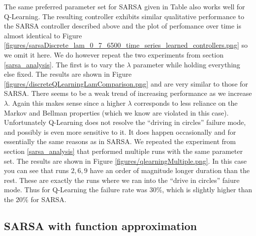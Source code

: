 \documentclass{article}
\begin{document}
The same preferred parameter set for SARSA given in Table  also works well for Q-Learning. The resulting controller exhibits similar qualitative performance to the SARSA controller described above and the plot of perfomance over time is almost identical to Figure \ref{figures/sarsaDiscrete_lam_0_7_6500_time_series_learned_controllers.png} so we omit it here. We do however repeat the two experiments from section \ref{sarsa_analysis}. The first is to vary the $\lambda$ parameter while holding everything else fixed. The results are shown in Figure \ref{figures/discreteQLearningLamComparison.png} and are very similar to those for SARSA. There seems to be a weak trend of increasing performance as we increase $\lambda$. Again this makes sense since a higher $\lambda$ corresponds to less reliance on the Markov and Bellman properties (which we know are violated in this case). Unfortunately Q-Learning does not resolve the ``driving in circles'' failure mode, and possibly is even more sensitive to it. It does happen occasionally and for essentially the same reasons as in SARSA. We repeated the experiment from section \ref{sarsa_analysis} that performed multiple runs with the same parameter set. The results are shown in Figure \ref{figures/qlearningMultiple.png}. In this case you can see that runs $2,6,9$ have an order of magnitude longer duration than the rest. These are exactly the runs where we ran into the ``drive in circles'' faiure mode. Thus for Q-Learning the failure rate was $30\%$, which is slightly higher than the $20\%$ for SARSA.




\subsection{SARSA with function approximation}
\label{sarsa_function_approximation}
\end{document}
